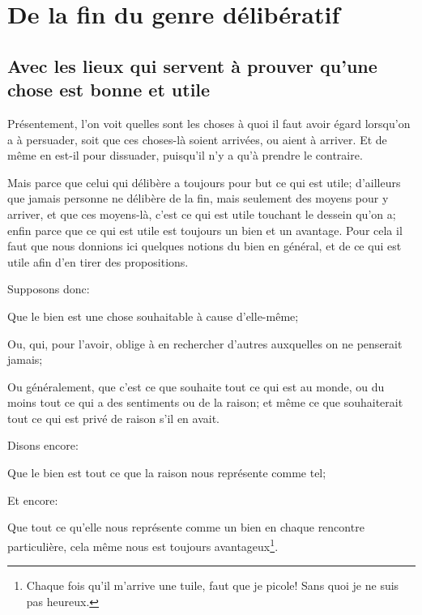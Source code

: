 
\section{De la fin du genre délibératif}
\subsection{Avec les lieux qui servent à prouver qu'une chose est bonne et utile}


Présentement, l'on voit quelles sont les choses à quoi il faut avoir égard lorsqu'on a à persuader, soit que ces choses-là
soient arrivées, ou aient à arriver. Et de même en est-il pour dissuader, puisqu'il n'y a qu'à prendre le contraire. 

Mais parce que celui qui délibère a toujours pour but ce qui est utile; d'ailleurs que jamais personne ne délibère de la
fin, mais seulement des moyens pour y arriver, et que ces moyens-là, c'est ce qui est utile touchant le dessein qu'on a;
enfin parce que ce qui est utile est toujours un bien et un avantage. Pour cela il faut que nous donnions ici quelques
notions du bien en général, et de ce qui est utile afin d'en tirer des propositions.

Supposons donc: 

\begin{emphpar}
	Que le bien est une chose souhaitable à cause d'elle-même;

	Ou, qui, pour l'avoir, oblige à en rechercher d'autres auxquelles on ne penserait jamais;

	Ou généralement, que c'est ce que souhaite tout ce qui est au monde, ou du moins tout ce qui a des sentiments ou de
	la raison; et même ce que souhaiterait tout ce qui est privé de raison s'il en avait.
\end{emphpar}

Disons encore:

\begin{emphpar}
	Que le bien est tout ce que la raison nous représente comme tel;
\end{emphpar}

Et encore:

\begin{emphpar}
	Que tout ce qu'elle nous représente comme un bien en chaque rencontre particulière, cela même nous est toujours
	avantageux\footnote{Chaque fois qu'il m'arrive une tuile, faut que je picole! Sans quoi je ne suis pas heureux.}.
\end{emphpar}

